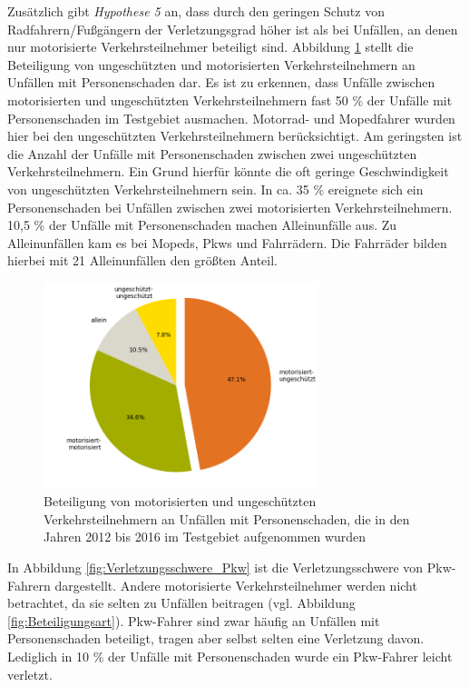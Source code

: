 Zusätzlich gibt \textit{Hypothese 5} an, dass durch den geringen Schutz von Radfahrern/Fußgängern der Verletzungsgrad höher ist als bei Unfällen, an denen nur motorisierte Verkehrsteilnehmer beteiligt sind. Abbildung \ref{fig:Verkehrsbeteiligung_Personenschaden} stellt die Beteiligung von ungeschützten und motorisierten Verkehrsteilnehmern an Unfällen mit Personenschaden dar. Es ist zu erkennen, dass Unfälle zwischen motorisierten und ungeschützten Verkehrsteilnehmern fast 50 \% der Unfälle mit Personenschaden im Testgebiet ausmachen. Motorrad- und Mopedfahrer wurden hier bei den ungeschützten Verkehrsteilnehmern berücksichtigt. Am geringsten ist die Anzahl der Unfälle mit Personenschaden zwischen zwei ungeschützten Verkehrsteilnehmern. Ein Grund hierfür könnte die oft geringe Geschwindigkeit von ungeschützten Verkehrsteilnehmern sein. In ca. 35 \% ereignete sich ein Personenschaden bei Unfällen zwischen zwei motorisierten Verkehrsteilnehmern. 10,5 \% der Unfälle mit Personenschaden machen Alleinunfälle aus. Zu Alleinunfällen kam es bei Mopeds, Pkws und Fahrrädern. Die Fahrräder bilden hierbei mit 21 Alleinunfällen den größten Anteil.

\begin{savenotes}
	\begin{figure}[H]
		\centering
		\includegraphics[width=8cm,height=6cm]{figures/motorisiert_ungeschuetzt}
		\caption[Beteiligung von motorisierten und ungeschützten Verkehrsteilnehmern an Unfällen mit Personenschaden, die in den Jahren 2012 bis 2016 im Testgebiet aufgenommen wurden]{Beteiligung von motorisierten und ungeschützten Verkehrsteilnehmern an Unfällen mit Personenschaden, die in den Jahren 2012 bis 2016 im Testgebiet aufgenommen wurden}\label{fig:Verkehrsbeteiligung_Personenschaden}
	\end{figure}
\end{savenotes}

In Abbildung \ref{fig:Verletzungsschwere_Pkw} ist die Verletzungsschwere von Pkw-Fahrern dargestellt. Andere motorisierte Verkehrsteilnehmer werden nicht betrachtet, da sie selten zu Unfällen beitragen (vgl. Abbildung \ref{fig:Beteiligungsart}). Pkw-Fahrer sind zwar häufig an Unfällen mit Personenschaden beteiligt, tragen aber selbst selten eine Verletzung davon. Lediglich in 10 \% der Unfälle mit Personenschaden wurde ein Pkw-Fahrer leicht verletzt.


